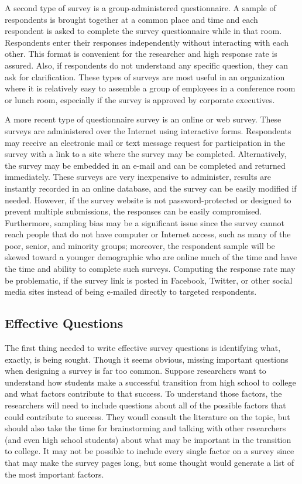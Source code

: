 A second type of survey is a group-administered questionnaire. A sample of respondents is brought together at a common place and time and each respondent is asked to complete the survey questionnaire while in that room. Respondents enter their responses independently without interacting with each other. This format is convenient for the researcher and high response rate is assured. Also, if respondents do not understand any specific question, they can ask for clarification. These types of surveys are most useful in an organization where it is relatively easy to assemble a group of employees in a conference room or lunch room, especially if the survey is approved by corporate executives.

A more recent type of questionnaire survey is an online or web survey. These surveys are administered over the Internet using interactive forms. Respondents may receive an electronic mail or text message request for participation in the survey with a link to a site where the survey may be completed. Alternatively, the survey may be embedded in an e-mail and can be completed and returned immediately. These surveys are very inexpensive to administer, results are instantly recorded in an online database, and the survey can be easily modified if needed. However, if the survey website is not password-protected or designed to prevent multiple submissions, the responses can be easily compromised. Furthermore, sampling bias may be a significant issue since the survey cannot reach people that do not have computer or Internet access, such as many of the poor, senior, and minority groups; moreover, the respondent sample will be skewed toward a younger demographic who are online much of the time and have the time and ability to complete such surveys. Computing the response rate may be problematic, if the survey link is posted in Facebook, Twitter, or other social media sites instead of being e-mailed directly to targeted respondents. 

\subsection{Effective Questions}

The first thing needed to write effective survey questions is identifying what, exactly, is being sought. Though it seems obvious, missing important questions when designing a survey is far too common. Suppose researchers want to understand how students make a successful transition from high school to college and what factors contribute to that success. To understand those factors, the researchers will need to include questions about all of the possible factors that could contribute to success. They woudl consult the literature on the topic, but should also take the time for brainstorming and talking with other researchers (and even high school students) about what may be important in the transition to college. It may not be possible to include every single factor on a survey since that may make the survey pages long, but some thought would generate a list of the most important factors.

